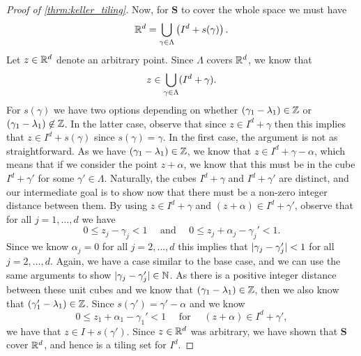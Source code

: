 \documentclass[../thesis.tex]{subfiles}
\begin{document}
\begin{proof}[Proof of \cref{thrm:keller_tiling}]
    Now, for $\mathbf{S}$ to cover the whole space we must have
    \begin{equation*}
        \mathbb{R}^d = \bigcup_{\gamma\in\Lambda} \left(I^d + s(\gamma)\right).
    \end{equation*}
    Let $z\in \mathbb{R}^d$ denote an arbitrary point. Since $\Lambda$ covers $\mathbb{R}^d$, we know that
    \begin{equation*}
        z\in \bigcup_{\gamma\in\Lambda} (I^d + \gamma).
    \end{equation*}
    For $s(\gamma)$ we have two options depending on whether $(\gamma_1-\lambda_1) \in\mathbb{Z}$ or $(\gamma_1-\lambda_1) \not\in\mathbb{Z}$. In the latter case, observe that since $z\in I^d+\gamma$ then this implies that $z\in I^d+s(\gamma)$ since $s(\gamma) = \gamma$. In the first case, the argument is not as straightforward. As we have $(\gamma_1-\lambda_1)\in \mathbb{Z}$, we know that $z\in I^d+\gamma-\alpha$, which means that if we consider the point $z+\alpha$, we know that this must be in the cube $I^d+\gamma'$ for some $\gamma'\in \Lambda$. Naturally, the cubes $I^d+\gamma$ and $I^d+\gamma'$ are distinct, and our intermediate goal is to show now that there must be a non-zero integer distance between them. By using $z\in I^d+\gamma$ and $(z+\alpha) \in I^d+\gamma'$, observe that for all $j=1,\dots, d$ we have
    \begin{equation*}
        0 \leq z_j - \gamma_j < 1 \quad \text{ and } \quad 0 \leq z_j + \alpha_j - \gamma_j' < 1.
    \end{equation*}
    Since we know $\alpha_j = 0$ for all $j=2,\dots,d$ this implies that $|\gamma_j-\gamma_j'| <1$ for all $j=2,\dots,d$. Again, we have a case similar to the base case, and we can use the same arguments to show $|\gamma_j-\gamma_j'| \in \mathbb{N}$. As there is a positive integer distance between these unit cubes and we know that $(\gamma_1-\lambda_1) \in\mathbb{Z}$, then we also know that $(\gamma_1'-\lambda_1) \in\mathbb{Z}$. Since $s(\gamma') = \gamma'-\alpha$ and we know
    \begin{equation*}
        0\leq z_1+\alpha_1 - \gamma_1' < 1 \quad \text{ for } \quad (z+\alpha) \in I^d+\gamma',
    \end{equation*}
    we have that $z\in I+s(\gamma')$. Since $z\in\mathbb{R}^d$ was arbitrary, we have shown that $\mathbf{S}$ cover $\mathbb{R}^d$, and hence is a tiling set for $I^d$.
\end{proof}

\end{document}
